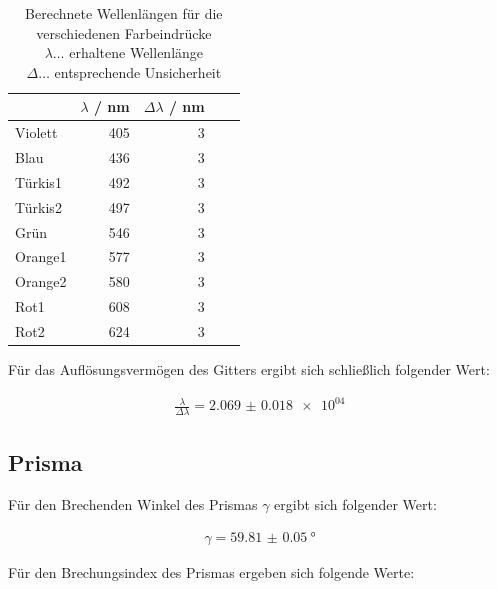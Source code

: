 \documentclass[11pt,ngerman]{scrartcl}
\begin{document}
\begin{table}[H]
	\caption{Berechnete Wellenlängen für die verschiedenen Farbeindrücke \\ $\lambda \dots$ erhaltene Wellenlänge \\ $\Delta \dots $ entsprechende Unsicherheit}
	\centering
	\begin{tabular}{lrrrr}
		\toprule
		{}      & $\lambda$ / \si{\nm} & $\Delta \lambda$ / \si{\nm} \\
		\midrule
		Violett & 405                  & 3                           \\
		Blau    & 436                  & 3                           \\
		Türkis1 & 492                  & 3                           \\
		Türkis2 & 497                  & 3                           \\
		Grün    & 546                  & 3                           \\
		Orange1 & 577                  & 3                           \\
		Orange2 & 580                  & 3                           \\
		Rot1    & 608                  & 3                           \\
		Rot2    & 624                  & 3                           \\
		\bottomrule
	\end{tabular}
\end{table}

Für das Auflösungsvermögen des Gitters ergibt sich schließlich folgender Wert:

\begin{align*}
	\frac{\lambda}{\Delta \lambda} = \num{2.069(18)e+04}
\end{align*}

\newpage

\subsection{Prisma}

Für den Brechenden Winkel des Prismas $\gamma$ ergibt sich folgender Wert:

\begin{align*}
	\gamma = \SI{59.81(5)}{\degree}
\end{align*}

Für den Brechungsindex des Prismas ergeben sich folgende Werte:
\end{document}
